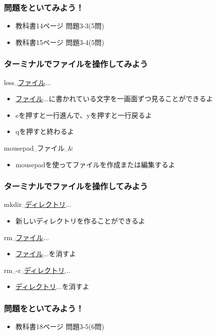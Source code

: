 \begin{frame}
    \frametitle{問題をといてみよう！}
    \begin{itemize}
        \item 教科書14ページ 問題3-3(5問)
        \item 教科書15ページ 問題3-4(5問)
    \end{itemize}
\end{frame}

\begin{frame}
    \frametitle{ターミナルでファイルを操作してみよう}
    less␣\underline{ファイル}$\ldots$
    \begin{itemize}
        \item \underline{ファイル}$\ldots$に書かれている文字を一画面ずつ見ることができるよ
        \item eを押すと一行進んで、yを押すと一行戻るよ
        \item qを押すと終わるよ
    \end{itemize}
    mousepad␣ファイル␣\&
    \begin{itemize}
        \item mousepadを使ってファイルを作成または編集するよ
    \end{itemize}
\end{frame}

\begin{frame}
    \frametitle{ターミナルでファイルを操作してみよう}
    mkdir␣\underline{ディレクトリ}$\ldots$
    \begin{itemize}
        \item 新しいディレクトリを作ることができるよ
    \end{itemize}
    rm␣\underline{ファイル}$\ldots$
    \begin{itemize}
        \item \underline{ファイル}$\ldots$を消すよ
    \end{itemize}
    rm␣-r␣\underline{ディレクトリ}$\ldots$
    \begin{itemize}
        \item \underline{ディレクトリ}$\ldots$を消すよ
    \end{itemize}
    \begin{figure}[h]
        \centering
        
    \end{figure}
\end{frame}

\begin{frame}
    \frametitle{問題をといてみよう！}
    \begin{itemize}
        \item 教科書18ページ 問題3-5(6問)
    \end{itemize}
\end{frame}

